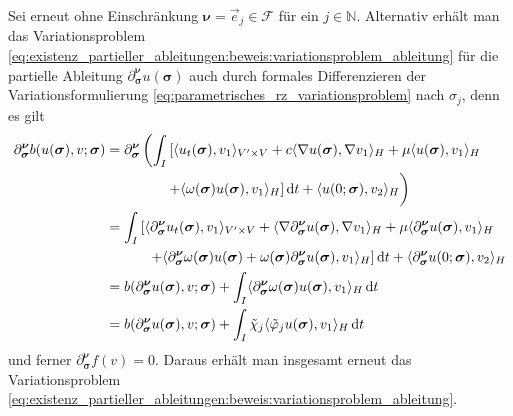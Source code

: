 \documentclass[../main.tex]{subfiles}
\begin{document}
\begin{Bemerkung}
\label{bemerkung:alternative_herleitung_variationsproblem_ableitung}
    Sei erneut ohne Einschränkung $\bm\nu = \vec e_{j} \in \mathcal{F}$ für ein $j \in \mathbb{N}$.
    Alternativ erhält man das Variationsproblem \cref{eq:existenz_partieller_ableitungen:beweis:variationsproblem_ableitung} für die partielle Ableitung $\partial^{\bm\nu}_{\bm\sigma} u(\bm\sigma)$ auch durch formales Differenzieren der Variationsformulierung \cref{eq:parametrisches_rz_variationsproblem} nach $\sigma_{j}$, denn es gilt
    \begin{align}
        \partial^{\bm\nu}_{\bm\sigma} b(u(\bm\sigma), v; \bm\sigma)
        &= \partial^{\bm\nu}_{\bm\sigma} \left( \int_{I} \left[ \skp{u_{t}(\bm\sigma)}{v_{1}}{V' \times V} + c \skp{\grad u(\bm\sigma)}{\grad v_{1}}{H} + \mu \skp{u(\bm\sigma)}{v_{1}}{H} \right.\right.
        \\&\qquad\qquad \left.\vphantom{\int_{I}}\left. + \skp{\omega(\bm\sigma) u(\bm\sigma)}{v_{1}}{H} \right] \diff t + \skp{u(0; \bm\sigma)}{v_{2}}{H} \right)
        \\&= \int_{I} \left[ \skp{\partial^{\bm\nu}_{\bm\sigma} u_{t}(\bm\sigma)}{v_{1}}{V' \times V}
            + \skp{\grad \partial^{\bm\nu}_{\bm\sigma} u(\bm\sigma)}{\grad v_{1}}{H} + \mu \skp{\partial^{\bm\nu}_{\bm\sigma} u(\bm\sigma)}{v_{1}}{H} \right.
        \\&\qquad \quad \left.+ \skp{\partial^{\bm\nu}_{\bm\sigma} \omega(\bm\sigma) u(\bm\sigma) + \omega(\bm\sigma) \partial^{\bm\nu}_{\bm\sigma} u(\bm\sigma)}{v_{1}}{H} \right] \diff t + \skp{\partial^{\bm\nu}_{\bm\sigma} u(0; \bm\sigma)}{v_{2}}{H}
        \\&= b(\partial^{\bm\nu}_{\bm\sigma} u(\bm\sigma), v; \bm\sigma) + \int_{I} \skp{\partial^{\bm\nu}_{\bm\sigma} \omega(\bm\sigma) u(\bm\sigma)}{v_{1}}{H} \diff t
        \\&= b(\partial^{\bm\nu}_{\bm\sigma} u(\bm\sigma), v; \bm\sigma) + \int_{I} \tilde{\chi}_{j} \skp{\tilde{\varphi}_{j} u(\bm\sigma)}{v_{1}}{H} \diff t
    \end{align}
    und ferner $\partial^{\bm\nu}_{\bm\sigma} f(v) = 0$.
    Daraus erhält man insgesamt erneut das Variationsproblem \cref{eq:existenz_partieller_ableitungen:beweis:variationsproblem_ableitung}.
\end{Bemerkung}
\end{document}
